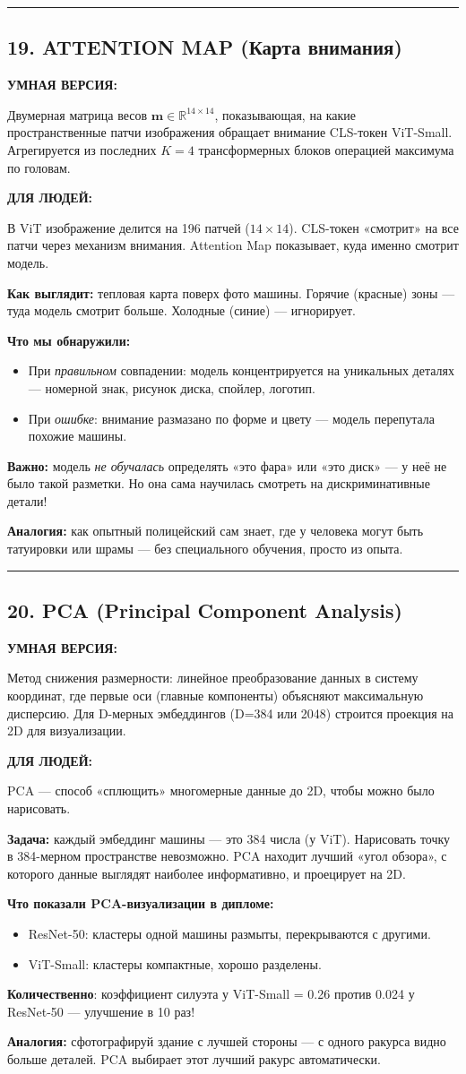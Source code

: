 \documentclass[12pt,a4paper]{article}
\newcommand{\term}[3]{
\noindent\rule{\textwidth}{1pt}
\subsection*{#1}

\textcolor{smartgreen}{\textbf{УМНАЯ ВЕРСИЯ:}}

#2

\vspace{0.5em}
\textcolor{simpleblue}{\textbf{ДЛЯ ЛЮДЕЙ:}}

#3

\vspace{1em}
}
\begin{document}
\term{19. ATTENTION MAP (Карта внимания)}
{Двумерная матрица весов $\mathbf{m} \in \mathbb{R}^{14\times14}$, показывающая, на какие пространственные патчи изображения обращает внимание CLS-токен ViT-Small. Агрегируется из последних $K=4$ трансформерных блоков операцией максимума по головам.}
{В ViT изображение делится на 196 патчей ($14\times14$). CLS-токен «смотрит» на все патчи через механизм внимания. Attention Map показывает, куда именно смотрит модель.

\textbf{Как выглядит:} тепловая карта поверх фото машины. Горячие (красные) зоны — туда модель смотрит больше. Холодные (синие) — игнорирует.

\textbf{Что мы обнаружили:}
\begin{itemize}
    \item При \emph{правильном} совпадении: модель концентрируется на уникальных деталях — номерной знак, рисунок диска, спойлер, логотип.
    \item При \emph{ошибке}: внимание размазано по форме и цвету — модель перепутала похожие машины.
\end{itemize}

\textbf{Важно:} модель \emph{не обучалась} определять «это фара» или «это диск» — у неё не было такой разметки. Но она сама научилась смотреть на дискриминативные детали!

\textbf{Аналогия:} как опытный полицейский сам знает, где у человека могут быть татуировки или шрамы — без специального обучения, просто из опыта.}

\term{20. PCA (Principal Component Analysis)}
{Метод снижения размерности: линейное преобразование данных в систему координат, где первые оси (главные компоненты) объясняют максимальную дисперсию. Для D-мерных эмбеддингов (D=384 или 2048) строится проекция на 2D для визуализации.}
{PCA — способ «сплющить» многомерные данные до 2D, чтобы можно было нарисовать.

\textbf{Задача:} каждый эмбеддинг машины — это 384 числа (у ViT). Нарисовать точку в 384-мерном пространстве невозможно. PCA находит лучший «угол обзора», с которого данные выглядят наиболее информативно, и проецирует на 2D.

\textbf{Что показали PCA-визуализации в дипломе:}
\begin{itemize}
    \item ResNet-50: кластеры одной машины размыты, перекрываются с другими.
    \item ViT-Small: кластеры компактные, хорошо разделены.
\end{itemize}

\textbf{Количественно}: коэффициент силуэта у ViT-Small = 0.26 против 0.024 у ResNet-50 — улучшение в 10 раз!

\textbf{Аналогия:} сфотографируй здание с лучшей стороны — с одного ракурса видно больше деталей. PCA выбирает этот лучший ракурс автоматически.}
\end{document}
